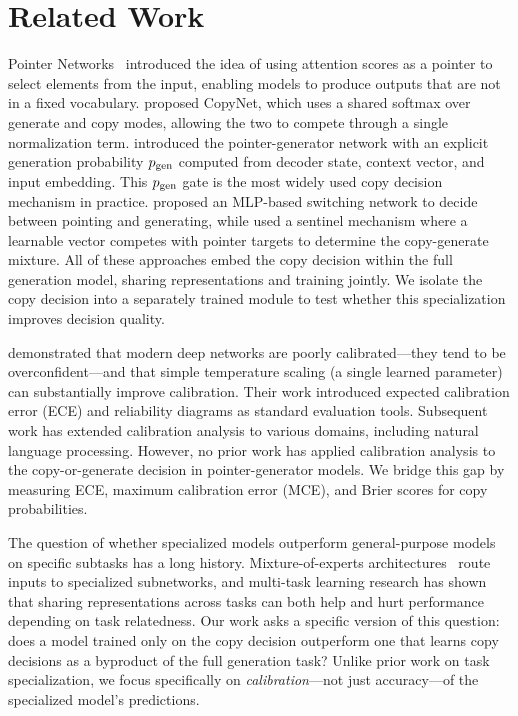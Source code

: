 \section{Related Work}
\label{sec:related}

Pointer Networks~\cite{vinyals2015pointer} introduced the idea of using attention scores as a pointer to select elements from the input, enabling models to produce outputs that are not in a fixed vocabulary. \citet{gu2016copynet} proposed CopyNet, which uses a shared softmax over generate and copy modes, allowing the two to compete through a single normalization term. \citet{see2017get} introduced the pointer-generator network with an explicit generation probability $p_{\text{gen}}$ computed from decoder state, context vector, and input embedding. This $p_{\text{gen}}$ gate is the most widely used copy decision mechanism in practice. \citet{gulcehre2016pointing} proposed an MLP-based switching network to decide between pointing and generating, while \citet{merity2016pointer} used a sentinel mechanism where a learnable vector competes with pointer targets to determine the copy-generate mixture. All of these approaches embed the copy decision within the full generation model, sharing representations and training jointly. We isolate the copy decision into a separately trained module to test whether this specialization improves decision quality.

\citet{guo2017calibration} demonstrated that modern deep networks are poorly calibrated---they tend to be overconfident---and that simple temperature scaling (a single learned parameter) can substantially improve calibration. Their work introduced expected calibration error (ECE) and reliability diagrams as standard evaluation tools. Subsequent work has extended calibration analysis to various domains, including natural language processing. However, no prior work has applied calibration analysis to the copy-or-generate decision in pointer-generator models. We bridge this gap by measuring ECE, maximum calibration error (MCE), and Brier scores for copy probabilities.

The question of whether specialized models outperform general-purpose models on specific subtasks has a long history. Mixture-of-experts architectures~\cite{vaswani2017attention} route inputs to specialized subnetworks, and multi-task learning research has shown that sharing representations across tasks can both help and hurt performance depending on task relatedness. Our work asks a specific version of this question: does a model trained only on the copy decision outperform one that learns copy decisions as a byproduct of the full generation task? Unlike prior work on task specialization, we focus specifically on \emph{calibration}---not just accuracy---of the specialized model's predictions.